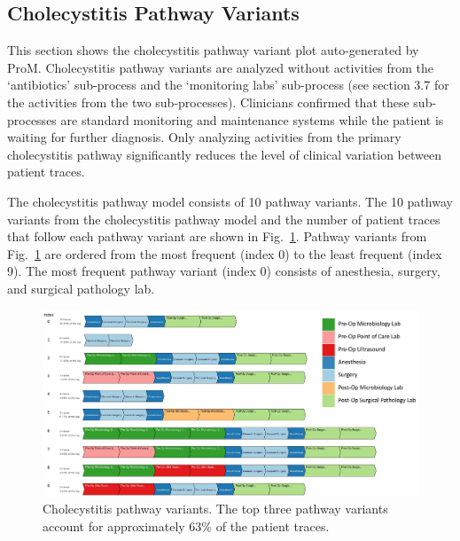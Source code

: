 \documentclass{elsarticle}
\begin{document}
\subsection{Cholecystitis Pathway Variants}
This section shows the cholecystitis pathway variant plot auto-generated by ProM. Cholecystitis pathway variants are analyzed without activities from the `antibiotics' sub-process and the `monitoring labs' sub-process (see section 3.7 for the activities from the two sub-processes). Clinicians confirmed that these sub-processes are standard monitoring and maintenance systems while the patient is waiting for further diagnosis. Only analyzing activities from the primary cholecystitis pathway significantly reduces the level of clinical variation between patient traces.

The cholecystitis pathway model consists of 10 pathway variants. The 10 pathway variants from the cholecystitis pathway model and the number of patient traces that follow each pathway variant are shown in Fig.~\ref{fig:cholecystitis pathway variants}. Pathway variants from Fig.~\ref{fig:cholecystitis pathway variants} are ordered from the most frequent (index 0) to the least frequent (index 9). The most frequent pathway variant (index 0) consists of anesthesia, surgery, and surgical pathology lab.

\begin{figure}[t]
\hspace{-2cm}
\includegraphics[width=1.5\textwidth]{images/cholecystitis_variant_index_anes.jpg}
\caption{Cholecystitis pathway variants. The top three pathway variants account for approximately 63\% of the patient traces.}
\label{fig:cholecystitis pathway variants}
\end{figure}
\end{document}
